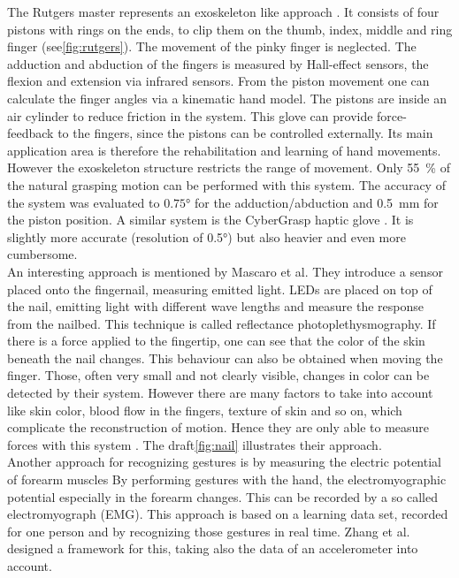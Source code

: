 The Rutgers master  represents an exoskeleton like approach \cite{bouzit2002rutgers}. It consists of four pistons with rings on the ends, to clip them on the thumb, index, middle and ring finger (see\ref{fig:rutgers}). The movement of the pinky finger is neglected. The adduction and abduction of the fingers is measured by Hall-effect sensors, the flexion and extension via infrared sensors. From the piston movement one can calculate the finger angles via a kinematic hand model. The pistons are inside an air cylinder to reduce friction in the system. This glove can provide force-feedback to the fingers, since the pistons can be controlled externally. Its main application area is therefore the rehabilitation and learning of hand movements. However the exoskeleton structure restricts the range of movement. Only \SI{55}{\percent} of the natural grasping motion can be performed with this system. The accuracy of the system was evaluated to $ \ang{0.75} $ for the adduction/abduction and \SI{0.5}{mm} for the piston position. A similar system is the CyberGrasp haptic glove \cite{cyberglove}. It is slightly more accurate (resolution of \ang{0.5}) but also heavier and even more cumbersome.\\
An interesting approach is mentioned by Mascaro et al. They introduce a sensor placed onto the fingernail, measuring emitted light. LEDs are placed on top of the nail, emitting light with different wave lengths and measure the response from the nailbed. This technique is called reflectance photoplethysmography. If there is a force applied to the fingertip, one can see that the color of the skin beneath the nail changes. This behaviour can also be obtained when moving the finger. Those, often very small and not clearly visible, changes in color can be detected by their system. However there are many factors to take into account like skin color, blood flow in the fingers, texture of skin and so on, which complicate the reconstruction of motion. Hence they are only able to measure forces with this system \cite{mascaro2001photoplethysmograph}. The draft\ref{fig:nail} illustrates their approach.\\
Another approach for recognizing gestures is by measuring the electric potential of forearm muscles \cite{kim2008emg} By performing gestures with the hand, the electromyographic potential especially in the forearm changes. This can be recorded by a so called electromyograph (EMG). This approach is based on a learning data set, recorded for one person and by recognizing those gestures in real time. Zhang et al. designed a framework for this, taking also the data of an accelerometer into account.

